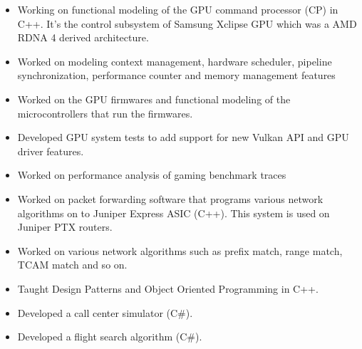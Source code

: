\begin{itemize}
	\item Working on functional modeling of the GPU command processor (CP) in C++. It's the control subsystem of Samsung Xclipse GPU which was a AMD RDNA 4 derived architecture. 
	\item Worked on modeling context management, hardware scheduler, pipeline synchronization, performance counter and memory management features
	\item Worked on the GPU firmwares and functional modeling of the microcontrollers that run the firmwares.
	\item Developed GPU system tests to add support for new Vulkan API
	 and GPU driver features.
	\item Worked on performance analysis of gaming benchmark traces
	
\end{itemize}

\divider

\begin{itemize}
	\item Worked on packet forwarding software that programs various network algorithms on to Juniper Express ASIC (C++). This system is used on Juniper PTX routers.
	\item Worked on various network algorithms such as prefix match, range match, TCAM match and so on. 
\end{itemize}

\divider

\begin{itemize}
	\item Taught Design Patterns and Object Oriented Programming in C++.
\end{itemize}

\divider

\begin{itemize}
	\item Developed a call center simulator (C\#).
\end{itemize}

\divider

\begin{itemize}
	\item Developed a flight search algorithm (C\#).
\end{itemize}

